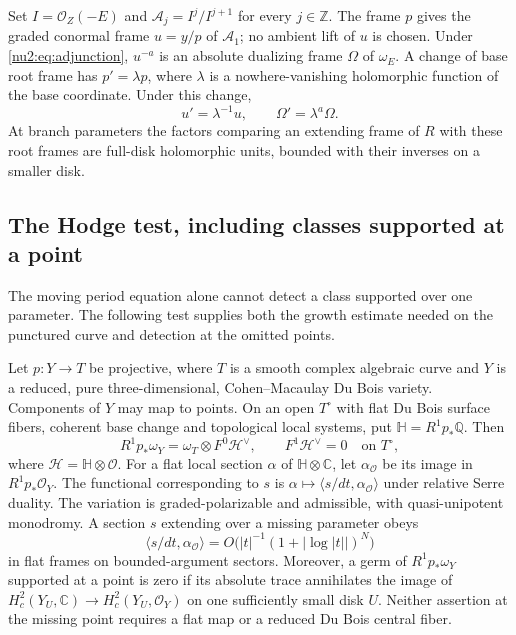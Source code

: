 Set $I=\mathcal O_Z(-E)$ and $\mathcal A_j=I^j/I^{j+1}$ for
every $j\in\mathbb Z$.  The frame $p$ gives the graded conormal
frame $u=y/p$ of $\mathcal A_1$; no ambient lift of $u$ is chosen.
Under \eqref{nu2:eq:adjunction}, $u^{-a}$ is an absolute dualizing
frame $\Omega$ of $\omega_E$.  A change of base root frame has
$p'=\lambda p$, where $\lambda$ is a nowhere-vanishing holomorphic
function of the base coordinate.  Under this change,
\begin{equation}\label{nu2:eq:frames}
 u'=\lambda^{-1}u,\qquad\Omega'=\lambda^a\Omega.
\end{equation}
At branch parameters the factors comparing an extending frame of $R$
with these root frames are full-disk holomorphic units, bounded with
their inverses on a smaller disk.

\subsection{The Hodge test, including classes supported at a point}\label{nu2:subsec:hodge}

The moving period equation alone cannot detect a class supported over one parameter.  The following test supplies both the growth estimate needed on the punctured curve and detection at the omitted points.

\begin{lemma}\label{nu2:lem:hodge-test}
Let $p:Y\to T$ be projective, where $T$ is a smooth complex
algebraic curve and $Y$ is a reduced, pure three-dimensional,
Cohen--Macaulay Du Bois variety.
Components of $Y$ may map to points.  On an open $T^\circ$ with flat
Du Bois surface fibers, coherent base change and topological local
systems, put $\mathbb H=R^1p_*\mathbb Q$.  Then
\begin{equation}\label{nu2:eq:hodge}
 R^1p_*\omega_Y=\omega_T\otimes F^0\mathcal H^\vee,
 \qquad F^1\mathcal H^\vee=0
 \quad\text{on }T^\circ,
\end{equation}
where $\mathcal H=\mathbb H\otimes\mathcal O$.  For a flat local
section $\alpha$ of $\mathbb H\otimes\mathbb C$, let
$\alpha_{\mathcal O}$ be its image in $R^1p_*\mathcal O_Y$.
The functional corresponding to $s$ is
$\alpha\mapsto\langle s/dt,\alpha_{\mathcal O}\rangle$ under
relative Serre duality.
The variation is graded-polarizable and admissible, with quasi-unipotent
monodromy.  A section $s$ extending over a missing parameter obeys
\begin{equation}\label{nu2:eq:one-pole}
 \langle s/dt,\alpha_{\mathcal O}\rangle
 =O\bigl(|t|^{-1}(1+|\log|t||)^N\bigr)
\end{equation}
in flat frames on bounded-argument sectors.  Moreover, a germ of
$R^1p_*\omega_Y$ supported at a point is zero if its absolute trace
annihilates the image of
$H_c^2(Y_U,\mathbb C)\to H_c^2(Y_U,\mathcal O_Y)$ on one
sufficiently small disk $U$.  Neither assertion at the missing point
requires a flat map or a reduced Du Bois central fiber.
\end{lemma}

